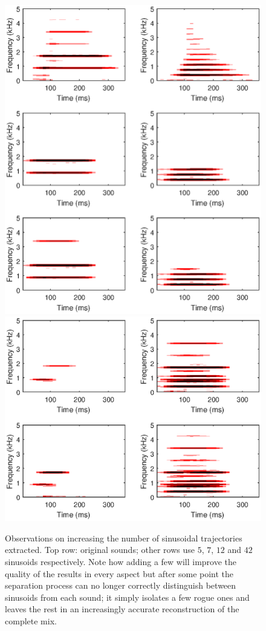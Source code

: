 \documentclass[12pt,a4paper,twoside,openright]{report}
\begin{document}
\begin{figure}
\centering
\includegraphics[width=0.7\linewidth]{../OutputSpectrograms/elementCountSinSpec1}
\includegraphics[width=0.7\linewidth]{../OutputSpectrograms/elementCountSinSpec2}
\caption[Observations on increasing the number of sinusoidal trajectories extracted.]{Observations on increasing the number of sinusoidal trajectories extracted. Top row: original sounds; other rows use $ 5 $, $ 7 $, $ 12 $ and $ 42 $ sinusoids respectively. Note how adding a few will improve the quality of the results in every aspect but after some point the separation process can no longer correctly distinguish between sinusoids from each sound; it simply isolates a few rogue ones and leaves the rest in an increasingly accurate reconstruction of the complete mix.}
\label{fig:elementCountSinSpec1}
\end{figure}
\end{document}
